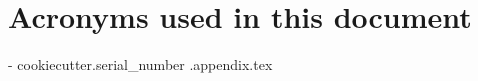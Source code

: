 {%
\newpage
\appendix
\section{Acronyms used in this document}\label{sec:acronyms}


\newpage
{%
}-{{ cookiecutter.serial_number }}.appendix.tex}
